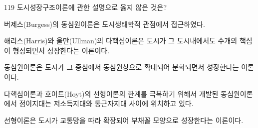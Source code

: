 \begin{question}{119}
도시성장구조이론에 관한 설명으로 옳지 않은 것은?
\begin{choices}
  \item 버제스(Burgess)의 동심원이론은 도시생태학적 관점에서 접근하였다.
  \item 해리스(Harris)와 울만(Ullman)의 다핵심이론은 도시가 그 도시내에서도 수개의 핵심이 형성되면서 성장한다는 이론이다.
  \item 동심원이론은 도시가 그 중심에서 동심원상으로 확대되어 분화되면서 성장한다는 이론이다.
  \item 다핵심이론과 호이트(Hoyt)의 선형이론의 한계를 극복하기 위해서 개발된 동심원이론에서 점이지대는 저소득지대와 통근자지대 사이에 위치하고 있다.
  \item 선형이론은 도시가 교통망을 따라 확장되어 부채꼴 모양으로 성장한다는 이론이다.
\end{choices}
\end{question}
